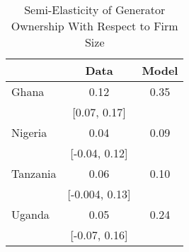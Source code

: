 \begin{table}[H] 
\singlespace 
\center 
\caption{Semi-Elasticity of Generator Ownership With Respect to Firm Size} \label{tab:elasticity}
\vspace{-.1in} 
\begin{tabular}{l c c}\hline 
\hline 
  	& Data & Model  \\ 
\hline 
 Ghana & 0.12 &     0.35  \\[-0.5ex] & [0.07, 0.17]  \\ Nigeria & 0.04 &     0.09  \\[-0.5ex] & 	[-0.04,   0.12]  \\ Tanzania & 0.06 &     0.10  \\[-0.5ex] &  [-0.004,   0.13]  \\ Uganda & 0.05 &     0.24  \\[-0.5ex] & [-0.07,  0.16] \\\hline 
\end{tabular}
\end{table} 
